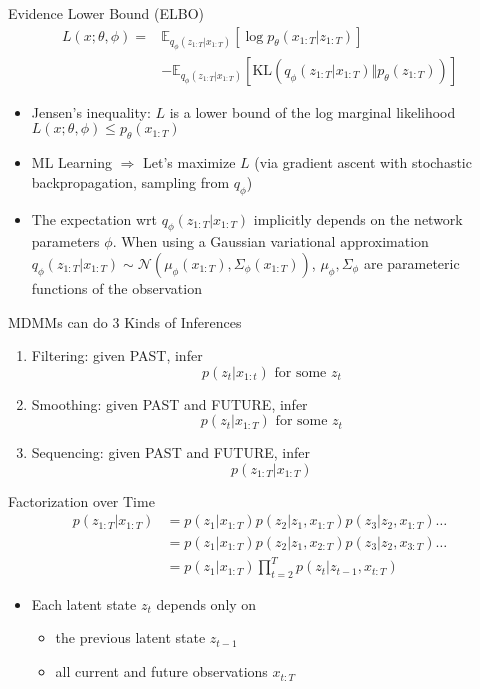 \documentclass{beamer}
\begin{document}
\begin{frame}{Evidence Lower Bound (ELBO)}
\[\begin{split}
L(x;\theta,\phi)=&\mathbb{E}_{q_\phi(z_{1:T}|x_{1:T})}[\log p_\theta(x_{1:T}|z_{1:T})]\\
&-\mathbb{E}_{q_\phi(z_{1:T}|x_{1:T})}[\text{KL}(q_\phi(z_{1:T}|x_{1:T})\Vert p_\theta(z_{1:T}))]
\end{split}\]
\begin{itemize}
\item Jensen's inequality: $L$ is a lower bound of the log marginal likelihood $L(x;\theta,\phi)\leqslant p_\theta(x_{1:T})$
\item ML Learning $\Rightarrow$ Let's maximize $L$ (via gradient ascent with stochastic backpropagation, sampling from $q_\phi$)
\item The expectation wrt $q_\phi(z_{1:T}|x_{1:T})$ implicitly depends on the network parameters $\phi$. When using a Gaussian variational approximation $q_\phi(z_{1:T}|x_{1:T})\sim\mathcal{N}(\mu_\phi(x_{1:T}),\Sigma_\phi(x_{1:T}))$, $\mu_\phi,\Sigma_\phi$ are parameteric functions of the observation
\end{itemize}
\end{frame}

\begin{frame}{MDMMs can do 3 Kinds of Inferences}
\begin{enumerate}
\item Filtering: given PAST, infer\[
p(z_t|x_{1:t})\text{ for some }z_t
\]
\item Smoothing: given PAST and FUTURE, infer\[
p(z_t|x_{1:T})\text{ for some }z_t
\]
\item Sequencing: given PAST and FUTURE, infer\[
p(z_{1:T}|x_{1:T})
\]
\end{enumerate}
\end{frame}

\begin{frame}{Factorization over Time}
\[
\begin{split}
p(z_{1:T}|x_{1:T})&=p(z_1|x_{1:T})p(z_2|z_1,x_{1:T})p(z_3|z_2,x_{1:T})\dots\\
&=p(z_1|x_{1:T})p(z_2|z_1,x_{2:T})p(z_3|z_2,x_{3:T})\dots\\
&=p(z_1|x_{1:T})\prod_{t=2}^Tp(z_t|z_{t-1},x_{t:T})
\end{split}
\]
\begin{itemize}
\item Each latent state $z_t$ depends only on
\begin{itemize}
\item the previous latent state $z_{t-1}$
\item all current and future observations $x_{t:T}$
\end{itemize}
\end{itemize}
\end{frame}
\end{document}
